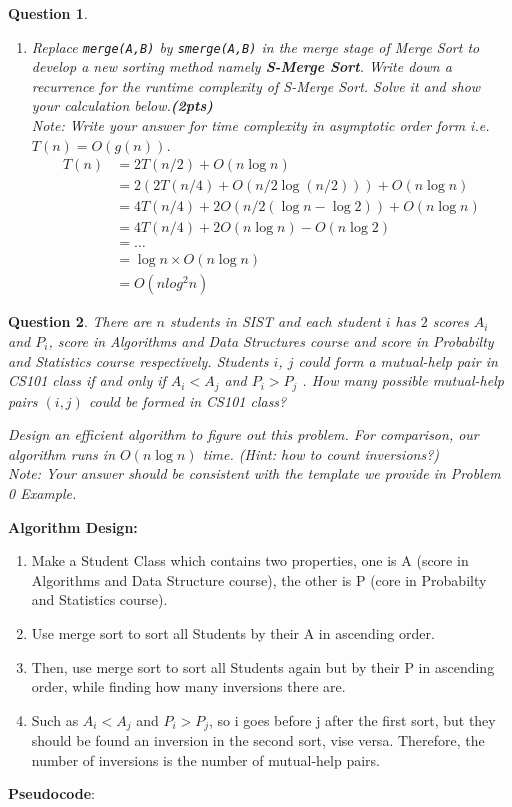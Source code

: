 \documentclass{article}
\newtheorem{Q}{Question}
\begin{document}
\begin{Q}
\begin{enumerate}[1.]
		\item  Replace \texttt{merge(A,B)} by \texttt{smerge(A,B)} in the merge stage of Merge Sort to develop a new sorting method namely \textbf{S-Merge Sort}. Write down a recurrence for the runtime complexity of S-Merge Sort. Solve it and show your calculation below.\textbf{(2pts)}\\
		      Note: Write your answer for time complexity in asymptotic order form i.e. $T(n)=O(g(n))$.
		      \begin{align*}
			      T(n) & =2T(n/2)+O(n\log n)                        \\
			           & =2(2T(n/4)+O(n/2\log (n/2)))+O(n\log n)    \\
			           & =4T(n/4)+2O(n/2(\log n-\log 2))+O(n\log n) \\
			           & =4T(n/4)+2O(n\log n)-O(n\log 2)            \\
			           & =\dots                                     \\
			           & =\log n \times O(n\log n)                  \\
			           & =O(nlog^2n)
		      \end{align*}
	\end{enumerate}
\end{Q}
\newpage

\begin{Q}
	There are $n$ students in SIST and each student $i$ has $2$ scores $A_i$ and $P_i$, score in Algorithms and Data Structures course and score in Probabilty and Statistics course respectively. Students $i$, $j$ could form a mutual-help pair in CS101 class if and only
	if $A_i < A_j$ and $P_i > P_j$ . How many possible mutual-help pairs $(i,j)$ could be formed in CS101 class?

	Design an efficient algorithm  to figure out this problem. For comparison, our
	algorithm runs in $O(n \log n)$ time. (Hint: how to count inversions?)\\

	Note: Your answer should be consistent with the template we provide in Problem 0 Example.
\end{Q}

\textbf{Algorithm Design:}
\begin{enumerate}
	\item Make a Student Class which contains two properties, one is A (score in Algorithms and Data Structure course), the other is P (core in Probabilty and Statistics course).
	\item Use merge sort to sort all Students by their A in ascending order.
	\item Then, use merge sort to sort all Students again but by their P in ascending order, while finding how many inversions there are.
	\item Such as $A_i<A_j$ and $P_i>P_j$, so i goes before j after the first sort, but they should be found an inversion in the second sort, vise versa. Therefore, the number of inversions is the number of mutual-help pairs.
\end{enumerate}
\textbf{Pseudocode}:
\end{document}
